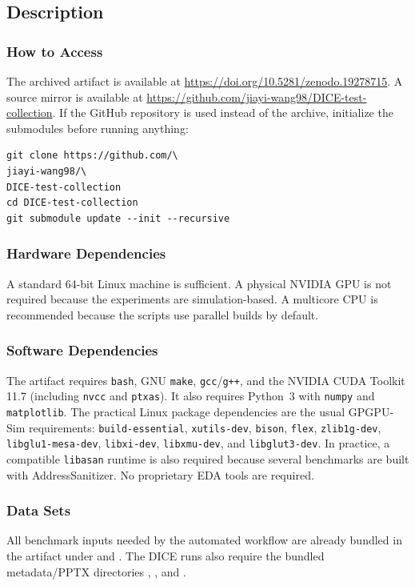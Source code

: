 \subsection{Description}

\subsubsection{How to Access}
The archived artifact is available at \url{https://doi.org/10.5281/zenodo.19278715}. A source mirror is available at \url{https://github.com/jiayi-wang98/DICE-test-collection}. If the GitHub repository is used instead of the archive, initialize the submodules before running anything:

\begin{verbatim}
git clone https://github.com/\
jiayi-wang98/\
DICE-test-collection
cd DICE-test-collection
git submodule update --init --recursive
\end{verbatim}

\subsubsection{Hardware Dependencies}
A standard 64-bit Linux machine is sufficient. A physical NVIDIA GPU is not required because the experiments are simulation-based. A multicore CPU is recommended because the scripts use parallel builds by default.

\subsubsection{Software Dependencies}
The artifact requires \texttt{bash}, GNU \texttt{make}, \texttt{gcc}/\texttt{g++}, and the NVIDIA CUDA Toolkit 11.7 (including \texttt{nvcc} and \texttt{ptxas}). It also requires Python~3 with \texttt{numpy} and \texttt{matplotlib}. The practical Linux package dependencies are the usual GPGPU-Sim requirements: \texttt{build-essential}, \texttt{xutils-dev}, \texttt{bison}, \texttt{flex}, \texttt{zlib1g-dev}, \texttt{libglu1-mesa-dev}, \texttt{libxi-dev}, \texttt{libxmu-dev}, and \texttt{libglut3-dev}. In practice, a compatible \texttt{libasan} runtime is also required because several benchmarks are built with AddressSanitizer. No proprietary EDA tools are required.

\subsubsection{Data Sets}
All benchmark inputs needed by the automated workflow are already bundled in the artifact under  and . The DICE runs also require the bundled metadata/PPTX directories , , and .

